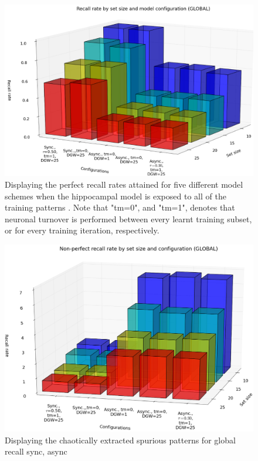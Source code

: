 \begin{figure}
    \centering
    \includegraphics[width=13cm]{fig/i-iters/global-recall}
    \caption{Displaying the perfect recall rates attained for five different model schemes when the hippocampal model is exposed to all of the training patterns . Note that "tm=0", and "tm=1", denotes that neuronal turnover is performed between every learnt training subset, or for every training iteration, respectively.}
    \label{fig:global-recall}
\end{figure}

\begin{figure}
    \centering
    \includegraphics[width=13cm]{fig/i-iters/global-spurious-recall}
    \caption{Displaying the chaotically extracted spurious patterns for global recall sync, async}
    \label{fig:global-recall-spurious}
\end{figure}

